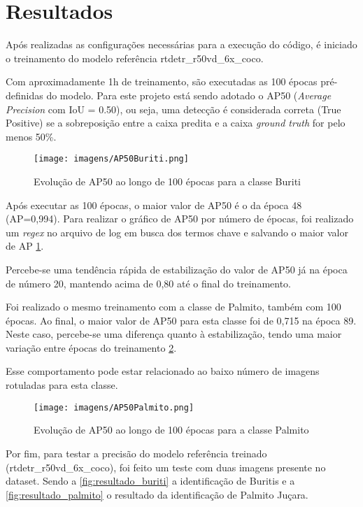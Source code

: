 \section{Resultados}

Após realizadas as configurações necessárias para a execução do código, é iniciado o treinamento do modelo referência rtdetr\_r50vd\_6x\_coco.

Com aproximadamente 1h de treinamento, são executadas as 100 épocas pré-definidas do modelo. Para este projeto está sendo adotado o AP50 (\textit{Average Precision} com IoU = 0.50), ou seja, uma detecção é considerada correta (True Positive) se a sobreposição entre a caixa predita e a caixa \textit{ground truth} for pelo menos 50\%.

\begin{figure}[H]
    \centering
    \texttt{[image: imagens/AP50Buriti.png]}
    \caption{Evolução de AP50 ao longo de 100 épocas para a classe Buriti}
    \label{fig:ap50buriti}
\end{figure}


Após executar as 100 épocas, o maior valor de AP50 é o da época 48 (AP=0,994). Para realizar o gráfico de AP50 por número de épocas, foi realizado um \textit{regex} no arquivo de log em busca dos termos chave e salvando o maior valor de AP \cref{fig:ap50buriti}.  

Percebe-se uma tendência rápida de estabilização do valor de AP50 já na época de número 20, mantendo acima de 0,80 até o final do treinamento.

Foi realizado o mesmo treinamento com a classe de Palmito, também com 100 épocas. Ao final, o maior valor de AP50 para esta classe foi de 0,715 na época 89. Neste caso, percebe-se uma diferença quanto à estabilização, tendo uma maior variação entre épocas do treinamento \cref{fig:ap50palmito}.

Esse comportamento pode estar relacionado ao baixo número de imagens rotuladas para esta classe.


\begin{figure}
    \centering
    \texttt{[image: imagens/AP50Palmito.png]}
    \caption{Evolução de AP50 ao longo de 100 épocas para a classe Palmito}
    \label{fig:ap50palmito}
\end{figure}




 
Por fim, para testar a precisão do modelo referência treinado (rtdetr\_r50vd\_6x\_coco), foi feito um teste com duas imagens presente no dataset. Sendo a \cref{fig:resultado_buriti} a identificação de Buritis e a \cref{fig:resultado_palmito} o resultado da identificação de Palmito Juçara.

